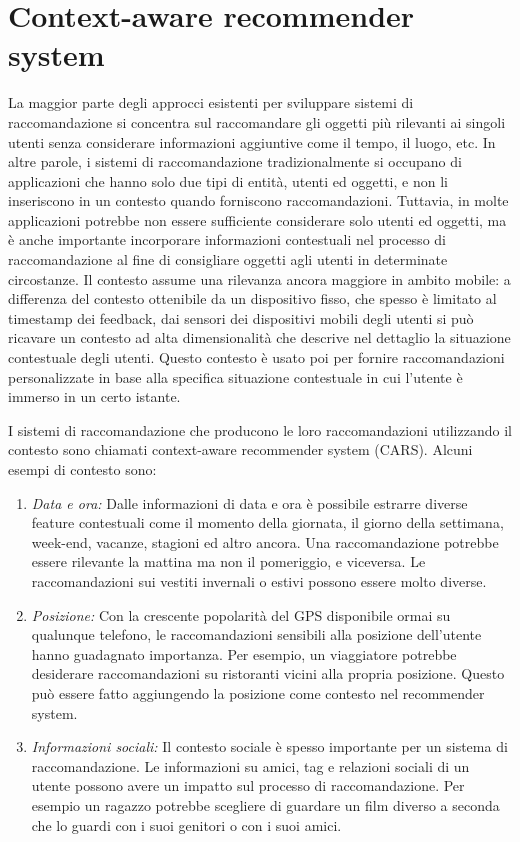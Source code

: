\documentclass[12pt,italian]{report}
\begin{document}
\section{Context-aware recommender system}
La maggior parte degli approcci esistenti per sviluppare sistemi di raccomandazione si concentra sul raccomandare gli oggetti più rilevanti ai singoli utenti senza considerare informazioni aggiuntive come il tempo, il luogo, etc. In altre parole, i sistemi di raccomandazione tradizionalmente si occupano di applicazioni che hanno solo due tipi di entità, utenti ed oggetti, e non li inseriscono in un contesto quando forniscono raccomandazioni. Tuttavia, in molte applicazioni potrebbe non essere sufficiente considerare solo utenti ed oggetti, ma è anche importante incorporare informazioni contestuali nel processo di raccomandazione al fine di consigliare oggetti agli utenti in determinate circostanze. Il contesto assume una rilevanza ancora maggiore in ambito mobile: a differenza del contesto ottenibile da un dispositivo fisso, che spesso è limitato al timestamp dei feedback, dai sensori dei dispositivi mobili degli utenti si può ricavare un contesto ad alta dimensionalità che descrive nel dettaglio la situazione contestuale degli utenti. Questo contesto è usato poi per fornire raccomandazioni personalizzate in base alla specifica situazione contestuale in cui l'utente è immerso in un certo istante.

I sistemi di raccomandazione che producono le loro raccomandazioni utilizzando il contesto sono chiamati context-aware recommender system  (CARS). Alcuni esempi di contesto sono:

\begin{enumerate}
 \item \textit{Data e ora:} Dalle informazioni di data e ora è possibile estrarre diverse feature contestuali come il momento della giornata, il giorno della settimana, week-end, vacanze, stagioni ed altro ancora. Una raccomandazione potrebbe essere rilevante la mattina ma non il pomeriggio, e viceversa. Le raccomandazioni sui vestiti invernali o estivi possono essere molto diverse.
 \item \textit{Posizione:} Con la crescente popolarità del GPS disponibile ormai su qualunque telefono, le raccomandazioni sensibili alla posizione dell'utente hanno guadagnato importanza. Per esempio, un viaggiatore potrebbe desiderare raccomandazioni su ristoranti vicini alla propria posizione. Questo può essere fatto aggiungendo la posizione come contesto nel recommender system.
 \item \textit{Informazioni sociali:} Il contesto sociale è spesso importante per un sistema di raccomandazione. Le informazioni su amici, tag e relazioni sociali di un utente possono avere un impatto sul processo di raccomandazione. Per esempio un ragazzo potrebbe scegliere di guardare un film diverso a seconda che lo guardi con i suoi genitori o con i suoi amici.
\end{enumerate} 
\end{document}
